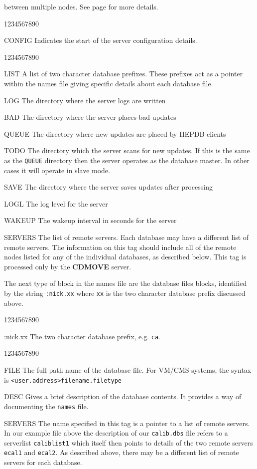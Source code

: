 between multiple nodes. See page \pageref{sect-CDMOVE} for more details.
\par
\begin{DLtt}{1234567890}
\item[CONFIG]Indicates the start of the server configuration details.
\begin{DLtt}{1234567890}
\item[LIST]A list of two character database prefixes. These prefixes
act as a pointer within the names file giving specific details
about each database file.
\item[LOG]The directory where the server logs are written
\item[BAD]The directory where the server places bad updates
\item[QUEUE]The directory where new updates are placed by HEPDB clients
\item[TODO]The directory which the server scans for new updates. If this
is the same as the {\tt QUEUE} directory then the server operates
as the database master. In other cases it will operate in slave mode.
\item[SAVE]The directory where the server saves updates after processing
\item[LOGL]The log level for the server
\item[WAKEUP]The wakeup interval in seconds for the server
\item[SERVERS]The list of remote servers. Each database
may have a different list of remote servers. The information
on this tag should include all of the remote nodes listed
for any of the individual databases, as described below.
This tag is processed only by the {\bf CDMOVE} server.
\end{DLtt}
\end{DLtt}
\par
%
The next type of block in the names file are the database files
blocks, identified by the string {\tt :nick.xx}
where {\tt xx} is the two character database prefix discussed above.
%
\par
\begin{DLtt}{1234567890}
\item[:nick.xx]The two character database prefix, e.g. {\tt ca}.
\begin{DLtt}{1234567890}
\item[FILE]The full path name of the database file. For VM/CMS systems,
the syntax is {\tt <user.address>filename.filetype}
\item[DESC]Gives a brief description of the database contents. It provides a way
of documenting the {\tt names} file.
\item[SERVERS]The name specified in this tag is a pointer to a
list of remote servers. In our example file above the description
of our {\tt calib.dbs} file refers to a serverlist {\tt caliblist1}
which itself then points to details of the two remote servers {\tt ecal1}
and {\tt ecal2}. As described above, there may be a different list
of remote servers for each database. 
\end{DLtt}
\end{DLtt}
